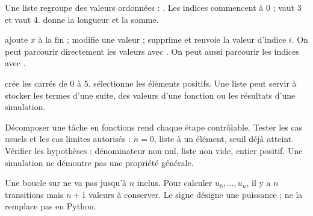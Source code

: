 \clearpage
{}
\begin{definition}
Une liste regroupe des valeurs ordonnées : .
Les indices commencent à 0 ;  vaut 3 et  vaut 4.
 donne la longueur et  la somme.
\end{definition}
\begin{propriete}
 ajoute $x$ à la fin ;  modifie une valeur ;
 supprime et renvoie la valeur d'indice $i$.
On peut parcourir directement les valeurs avec .
On peut aussi parcourir les indices avec .
\end{propriete}
\begin{savoirfaire}
 crée les carrés de 0 à 5.
\code{[x for x in L if x > 0]} sélectionne les éléments positifs.
Une liste peut servir à stocker les termes d'une suite, des valeurs d'une fonction
ou les résultats d'une simulation.
\end{savoirfaire}
\begin{propriete}
Décomposer une tâche en fonctions rend chaque étape contrôlable.
Tester les cas usuels et les cas limites autorisés : $n=0$, liste à un élément,
seuil déjà atteint. Vérifier les hypothèses : dénominateur non nul, liste non vide,
entier positif. Une simulation ne démontre pas une propriété générale.
\end{propriete}
\begin{attention}
Une boucle sur  ne va pas jusqu'à $n$ inclus. Pour calculer
$u_0,\ldots,u_n$, il y a $n$ transitions mais $n+1$ valeurs à conserver.
Le signe \code{**} désigne une puissance ; \code{\textasciicircum} ne la remplace pas en Python.
\end{attention}

\exercices

